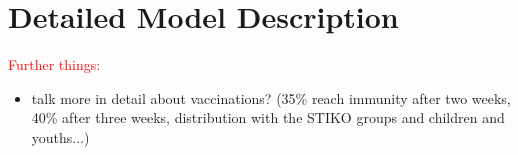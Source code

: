 \section{Detailed Model Description}
\label{sec:model}













\FloatBarrier







\textcolor{red}{Further things:}

\begin{itemize}
    \item talk more in detail about vaccinations? (35\% reach immunity after two weeks, 40\% after three weeks, distribution with the STIKO groups and children and youths...)
\end{itemize}

